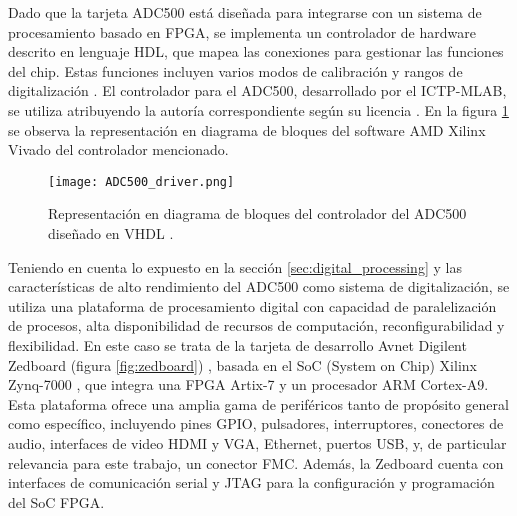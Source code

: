 \documentclass{report}
\begin{document}
\noindent Dado que la tarjeta ADC500 está diseñada para integrarse con un sistema de procesamiento basado en FPGA, se implementa un controlador de hardware descrito en lenguaje HDL, que mapea las conexiones para gestionar las funciones del chip. Estas funciones incluyen varios modos de calibración y rangos de digitalización \cite{ti_adc08500}. El controlador para el ADC500, desarrollado por el ICTP-MLAB, se utiliza atribuyendo la autoría correspondiente según su licencia \cite{ADC500driver}. En la figura \ref{fig:adc500driver} se observa la representación en diagrama de bloques del software AMD Xilinx Vivado \cite{vivado} del controlador mencionado.

\begin{figure}[H]
    \centering
    \texttt{[image: ADC500\_driver.png]}
    \caption{Representación en diagrama de bloques del controlador del ADC500 diseñado en VHDL \cite{ADC500driver}.}
    \label{fig:adc500driver}
\end{figure}


\noindent Teniendo en cuenta lo expuesto en la sección \ref{sec:digital_processing} y las características de alto rendimiento del ADC500 como sistema de digitalización, se utiliza una plataforma de procesamiento digital con capacidad de paralelización de procesos, alta disponibilidad de recursos de computación, reconfigurabilidad y flexibilidad. En este caso se trata de la tarjeta de desarrollo Avnet Digilent Zedboard (figura \ref{fig:zedboard}) \cite{avnet_zedboard}, basada en el SoC (System on Chip) Xilinx Zynq-7000 \cite{amd_zynq_7000}, que integra una FPGA Artix-7 y un procesador ARM Cortex-A9. Esta plataforma ofrece una amplia gama de periféricos tanto de propósito general como específico, incluyendo pines GPIO, pulsadores, interruptores, conectores de audio, interfaces de video HDMI y VGA, Ethernet, puertos USB, y, de particular relevancia para este trabajo, un conector FMC. Además, la Zedboard cuenta con interfaces de comunicación serial y JTAG para la configuración y programación del SoC FPGA.\\
\end{document}
